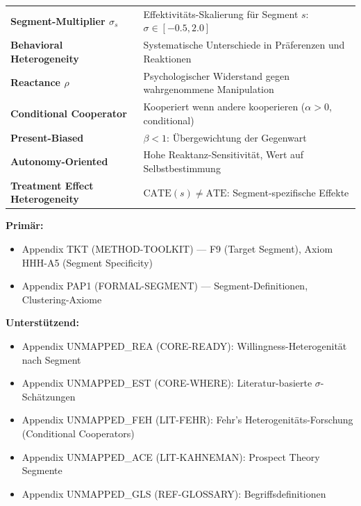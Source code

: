 \begin{tcolorbox}[colback=blue!5!white, colframe=blue!75!black,
    title=Zentrale Begriffe in diesem Kapitel]
\small
\begin{tabular}{@{}ll@{}}
\textbf{Segment-Multiplier $\sigma_s$} & Effektivitäts-Skalierung für Segment $s$: $\sigma \in [-0.5, 2.0]$ \\
\textbf{Behavioral Heterogeneity} & Systematische Unterschiede in Präferenzen und Reaktionen \\
\textbf{Reactance $\rho$} & Psychologischer Widerstand gegen wahrgenommene Manipulation \\
\textbf{Conditional Cooperator} & Kooperiert wenn andere kooperieren ($\alpha > 0$, conditional) \\
\textbf{Present-Biased} & $\beta < 1$: Übergewichtung der Gegenwart \\
\textbf{Autonomy-Oriented} & Hohe Reaktanz-Sensitivität, Wert auf Selbstbestimmung \\
\textbf{Treatment Effect Heterogeneity} & $\text{CATE}(s) \neq \text{ATE}$: Segment-spezifische Effekte \\
\end{tabular}
\end{tcolorbox}

\begin{tcolorbox}[colback=yellow!10!white, colframe=orange!75!black,
    title=Appendix References for This Chapter]

\textbf{Primär:}
\begin{itemize}[nosep]
\item Appendix TKT (METHOD-TOOLKIT) --- F9 (Target Segment), Axiom HHH-A5 (Segment Specificity)
\item Appendix PAP1 (FORMAL-SEGMENT) --- Segment-Definitionen, Clustering-Axiome
\end{itemize}

\textbf{Unterstützend:}
\begin{itemize}[nosep]
\item Appendix UNMAPPED_REA (CORE-READY): Willingness-Heterogenität nach Segment
\item Appendix UNMAPPED_EST (CORE-WHERE): Literatur-basierte $\sigma$-Schätzungen
\item Appendix UNMAPPED_FEH (LIT-FEHR): Fehr's Heterogenitäts-Forschung (Conditional Cooperators)
\item Appendix UNMAPPED_ACE (LIT-KAHNEMAN): Prospect Theory Segmente
\item Appendix UNMAPPED_GLS (REF-GLOSSARY): Begriffsdefinitionen
\end{itemize}
\end{tcolorbox}


